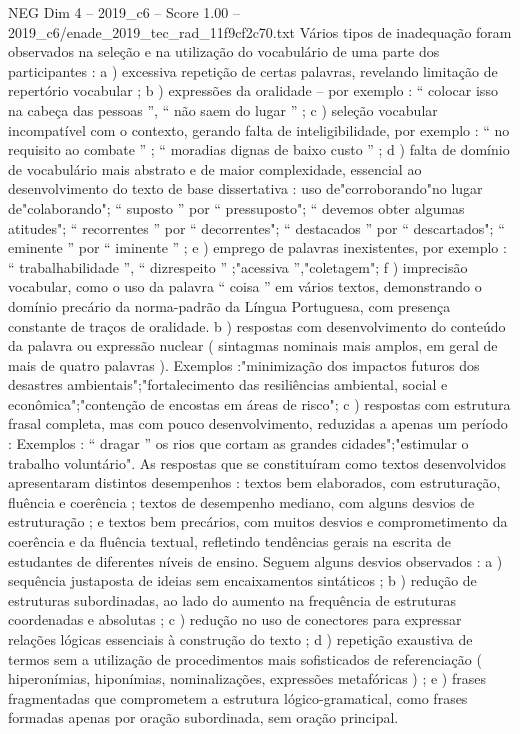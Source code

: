 \begin{textsample}{NEG Dim 4 – 2019\_c6 – Score 1.00 – 2019\_c6/enade\_2019\_tec\_rad\_11f9cf2c70.txt}
Vários tipos de inadequação foram observados na seleção e na utilização do vocabulário de uma parte dos participantes : a ) excessiva repetição de certas palavras, revelando limitação de repertório vocabular ; b ) expressões da oralidade – por exemplo : “ colocar isso na cabeça das pessoas ”, “ não saem do lugar ” ; c ) seleção vocabular incompatível com o contexto, gerando falta de inteligibilidade, por exemplo : “ no requisito ao combate ” ; “ moradias dignas de baixo custo ” ; d ) falta de domínio de vocabulário mais abstrato e de maior complexidade, essencial ao desenvolvimento do texto de base dissertativa : uso de"corroborando"no lugar de"colaborando"; “ suposto ” por “ pressuposto"; “ devemos obter algumas atitudes"; “ recorrentes ” por “ decorrentes"; “ destacados ” por “ descartados"; “ eminente ” por “ iminente ” ; e ) emprego de palavras inexistentes, por exemplo : “ trabalhabilidade ”, “ dizrespeito ” ;"acessiva ”,"coletagem"; f ) imprecisão vocabular, como o uso da palavra “ coisa ” em vários textos, demonstrando o domínio precário da norma-padrão da Língua Portuguesa, com presença constante de traços de oralidade. b ) respostas com desenvolvimento do conteúdo da palavra ou expressão nuclear ( sintagmas nominais mais amplos, em geral de mais de quatro palavras ).
Exemplos :"minimização dos impactos futuros dos desastres ambientais";"fortalecimento das resiliências ambiental, social e econômica";"contenção de encostas em áreas de risco"; c ) respostas com estrutura frasal completa, mas com pouco desenvolvimento, reduzidas a apenas um período : Exemplos : “ dragar ” os rios que cortam as grandes cidades";"estimular o trabalho voluntário".
As respostas que se constituíram como textos desenvolvidos apresentaram distintos desempenhos : textos bem elaborados, com estruturação, fluência e coerência ; textos de desempenho mediano, com alguns desvios de estruturação ; e textos bem precários, com muitos desvios e comprometimento da coerência e da fluência textual, refletindo tendências gerais na escrita de estudantes de diferentes níveis de ensino.
Seguem alguns desvios observados : a ) sequência justaposta de ideias sem encaixamentos sintáticos ; b ) redução de estruturas subordinadas, ao lado do aumento na frequência de estruturas coordenadas e absolutas ; c ) redução no uso de conectores para expressar relações lógicas essenciais à construção do texto ; d ) repetição exaustiva de termos sem a utilização de procedimentos mais sofisticados de referenciação ( hiperonímias, hiponímias, nominalizações, expressões metafóricas ) ; e ) frases fragmentadas que comprometem a estrutura lógico-gramatical, como frases formadas apenas por oração subordinada, sem oração principal.

\end{textsample}

